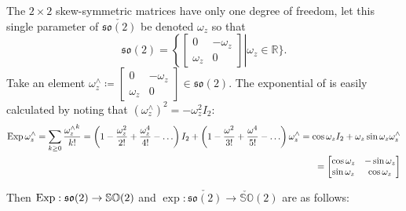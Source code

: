 The $2 \times 2$ skew-symmetric matrices have only one degree of freedom, let this single parameter of $\check{ \mathfrak{so}(2)}$ be denoted $\omega_z$ so that
\begin{equation}
  \mathfrak{so}(2) = \left\{ \begin{bmatrix} 0 & -\omega_z \\ \omega_z & 0 \end{bmatrix} \right | \omega_z \in \mathbb{R} \}.
\end{equation}
Take an element $\omega_z^\wedge \coloneq \begin{bmatrix} 0 & -\omega_z \\ \omega_z & 0 \end{bmatrix} \in \mathfrak{so}(2)$. The exponential of is easily calculated by noting that $(\omega_z^\wedge)^2 = -\omega_z^2 I_2$:
\begin{equation}
  \begin{aligned}
    \operatorname{Exp} {\omega_z^\wedge} = \sum_{k \geq 0} \frac{{\omega_z^\wedge}^k}{k!}
    = \left( 1 - \frac{\omega_z^2}{2!} + \frac{\omega_z^4}{4!} - \ldots \right) I_2 + \left( 1 - \frac{\omega^2}{3!} + \frac{\omega^4}{5!} - \ldots \right) {\omega_z^\wedge}
    = \cos \omega_z I_2 + \omega_z \sin \omega_z \omega_z^\wedge \\
    = \begin{bmatrix} \cos \omega_z & - \sin \omega_z \\ \sin \omega_z & \cos \omega_z \end{bmatrix}
  \end{aligned}
\end{equation}

Then $\operatorname{Exp} : \mathfrak{so}(2) \rightarrow {\mathbb{SO}(2)}$ and $\exp : \check{\mathfrak{so}(2)} \rightarrow \check{\mathbb{SO}}(2)$ are as follows:

